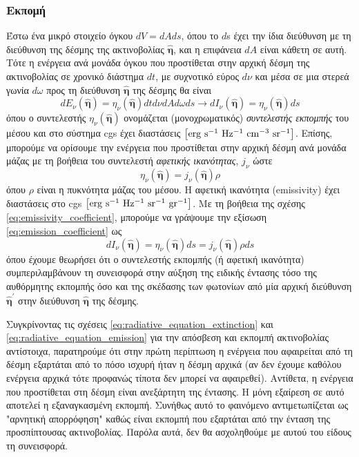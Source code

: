 \subsubsection{Εκπομή}
Έστω ένα μικρό στοιχείο όγκου $dV = dA ds$, όπου το $d$s έχει την ίδια διεύθυνση με τη διεύθυνση της δέσμης της ακτινοβολίας $\boldsymbol{\hat{\eta}}$, και η επιφάνεια $dA$ είναι κάθετη σε αυτή. Τότε η ενέργεια ανά μονάδα όγκου που προστίθεται στην αρχική δέσμη της ακτινοβολίας σε χρονικό διάστημα $dt$, με συχνοτικό εύρος $d\nu$ και μέσα σε μια στερεά γωνία $d\omega$ προς τη διεύθυνση $\boldsymbol{\hat{\eta}}$ της δέσμης θα είναι
\begin{equation}
    \label{eq:emission_coefficient}
    dE_{\nu}(\boldsymbol{\hat{\eta}}) = \eta_{\nu}(\boldsymbol{\hat{\eta}}) dt d\nu dA d\omega ds \longrightarrow dI_{\nu}(\boldsymbol{\hat{\eta}}) = \eta_{\nu}(\boldsymbol{\hat{\eta}}) ds
\end{equation}
όπου ο συντελεστής $\eta_{\nu}(\boldsymbol{\hat{\eta}})$ ονομάζεται (μονοχρωματικός) \textit{συντελεστής εκπομπής} του μέσου και στο σύστημα cgs έχει διαστάσεις $\rm \left[ erg \ s^{-1} \ Hz^{-1} \ cm^{-3} \ sr^{-1} \right]$. Επίσης, μπορούμε να ορίσουμε την ενέργεια που προστίθεται στην αρχική δέσμη ανά μονάδα μάζας με τη βοήθεια του συντελεστή \textit{αφετικής ικανότητας}, $j_{\nu}$ ώστε
\begin{equation}
    \label{eq:emissivity_coefficient}
    \eta_{\nu}(\boldsymbol{\hat{\eta}}) = j_{\nu}(\boldsymbol{\hat{\eta}}) \rho
\end{equation}
όπου $\rho$ είναι η πυκνότητα μάζας του μέσου. Η αφετική ικανότητα (emissivity) έχει διαστάσεις στο cgs $\rm \left[ erg \ s^{-1} \ Hz^{-1} \ sr^{-1} \ gr^{-1} \right]$. Με τη βοήθεια της σχέσης \eqref{eq:emissivity_coefficient}, μπορούμε να γράψουμε την εξίσωση \eqref{eq:emission_coefficient} ως
\begin{equation}
    \label{eq:radiative_equation_emission}
    \boxed{dI_{\nu}(\boldsymbol{\hat{\eta}}) = \eta_{\nu}(\boldsymbol{\hat{\eta}}) ds = j_{\nu}(\boldsymbol{\hat{\eta}}) \rho ds}
\end{equation}
όπου έχουμε θεωρήσει ότι ο συντελεστής εκπομπής (ή αφετική ικανότητα) συμπεριλαμβάνουν τη συνεισφορά στην αύξηση της ειδικής έντασης τόσο της αυθόρμητης εκπομπής όσο και της σκέδασης των φωτονίων από μία αρχική διεύθυνση $\boldsymbol{\hat{\eta}^{\prime}}$ στην διεύθυνση $\boldsymbol{\hat{\eta}}$ της δέσμης.

Συγκρίνοντας τις σχέσεις \eqref{eq:radiative_equation_extinction} και \eqref{eq:radiative_equation_emission} για την απόσβεση και εκπομπή ακτινοβολίας αντίστοιχα, παρατηρούμε ότι στην πρώτη περίπτωση η ενέργεια που αφαιρείται από τη δέσμη εξαρτάται από το πόσο ισχυρή ήταν η δέσμη αρχικά (αν δεν έχουμε καθόλου ενέργεια αρχικά τότε προφανώς τίποτα δεν μπορεί να αφαιρεθεί). Αντίθετα, η ενέργεια που προστίθεται στη δέσμη είναι ανεξάρτητη της έντασης. Η μόνη εξαίρεση σε αυτό αποτελεί η εξαναγκασμένη εκπομπή. Συνήθως αυτό το φαινόμενο αντιμετωπίζεται ως "αρνητική απορρόφηση" καθώς είναι εκπομπή που εξαρτάται από την ένταση της προσπίπτουσας ακτινοβολίας. Παρόλα αυτά, δεν θα ασχοληθούμε με αυτού του είδους τη συνεισφορά. 

